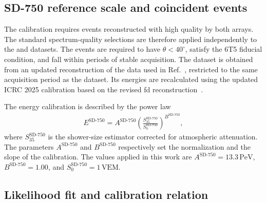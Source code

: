 \documentclass[main.tex]{subfiles}
\begin{document}
{{{\subsection{SD-750 reference scale and coincident events}
\label{subsec:calibration_sample}

The calibration requires events reconstructed with high quality by both arrays.
The standard spectrum-quality selections are therefore applied independently to the  and  datasets.
The events are required to have $\theta<40^\circ$, satisfy the 6T5 fiducial condition, and fall within periods of stable acquisition.
The  dataset is obtained from an updated reconstruction of the data used in Ref.~\cite{PierreAuger:2021:InfillSpectrum}, restricted to the same acquisition period as the  dataset.
Its energies are recalculated using the updated ICRC 2025 calibration based on the revised \gls{fd} reconstruction~\cite{PierreAuger:2025:EnergyScale,2026:Verzi:CalibrationSD750}.

The  energy calibration is described by the power law
\begin{align}
    E^{\text{SD-750}}
    =
    A^{\text{SD-750}}
    \left(
        \frac{S^{\text{SD-750}}_{35}}{S_0^{\text{SD-750}}}
    \right)^{B^{\text{SD-750}}},
    \label{eq:sd750_cal}
\end{align}
\noindent where $S^{\text{SD-750}}_{35}$ is the shower-size estimator corrected for atmospheric attenuation. 
The parameters $A^{\text{SD-750}}$ and  $B^{\text{SD-750}}$ respectively set the normalization and the slope of the calibration.
The values applied in this work are $A^{\text{SD-750}}=13.3\,\mathrm{PeV}$, $B^{\text{SD-750}}=1.00$, and $S_0^{\text{SD-750}}=1\,\mathrm{VEM}$.


\subsection{Likelihood fit and calibration relation}
\label{subsec:calibration_fit}

}}}
\end{document}
